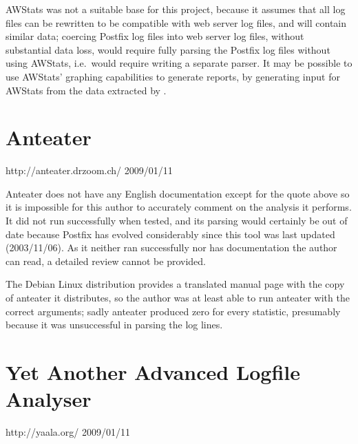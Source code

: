 AWStats was not a suitable base for this project, because it assumes that
all log files can be rewritten to be compatible with web server log files,
and will contain similar data; coercing Postfix log files into web server
log files, without substantial data loss, would require fully parsing the
Postfix log files without using AWStats, i.e.\ would require writing a
separate parser.  It may be possible to use AWStats' graphing capabilities
to generate reports, by generating input for AWStats from the data
extracted by \parsername{}.

\section{Anteater}

{http://anteater.drzoom.ch/}
{2009/01/11}

Anteater does not have any English documentation except for the quote above
so it is impossible for this author to accurately comment on the analysis
it performs.  It did not run successfully when tested, and its parsing
would certainly be out of date because Postfix has evolved considerably
since this tool was last updated (2003/11/06).  As it neither ran
successfully nor has documentation the author can read, a detailed review
cannot be provided.

The Debian Linux distribution provides a translated manual page with the
copy of anteater it distributes, so the author was at least able to run
anteater with the correct arguments; sadly anteater produced zero for every
statistic, presumably because it was unsuccessful in parsing the log lines.

\section{Yet Another Advanced Logfile Analyser}

{http://yaala.org/}
{2009/01/11}

